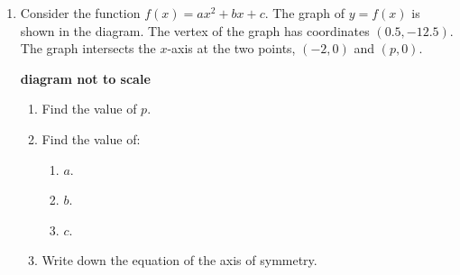 \documentclass[12pt, twoside]{article}
\begin{document}
\begin{enumerate}
\newpage
\item Consider the function $f(x)=ax^2 + bx+c$. The graph of $y=f(x)$ is shown in the diagram. The vertex of the graph has coordinates $(0.5, -12.5)$. The graph intersects the $x$-axis at the two points, $(-2,0)$ and $(p,0)$.
    \begin{flushright}
        \bf{diagram not to scale}
    \end{flushright}
        \begin{center}
        \end{center}
        \begin{enumerate}
            \item Find the value of $p$. \vspace{2.5cm}
            \item Find the value of:
            \begin{enumerate}[itemsep=1cm]
                \item $a$.
                \item $b$.
                \item $c$.
            \end{enumerate}\vspace{1.5cm}
            \item Write down the equation of the axis of symmetry.
        \end{enumerate}


\end{enumerate}
\end{document}
